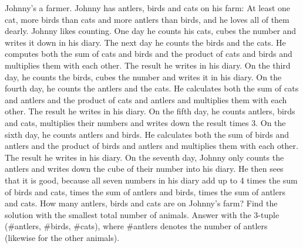 Johnny's a farmer. Johnny has antlers, birds and cats on his farm: At least one cat, more birds than cats and more antlers than birds, and he loves all of them dearly. Johnny likes counting. One day he counts his cats, cubes the number and writes it down in his diary. The next day he counts the birds and the cats. He computes both the sum of cats and birds and the product of cats and birds and multiplies them with each other. The result he writes in his diary.
On the third day, he counts the birds, cubes the number and writes it in his diary.
On the fourth day, he counts the antlers and the cats. He calculates both the sum of cats and antlers and the product of cats and antlers and multiplies them with each other. The result he writes in his diary.
On the fifth day, he counts antlers, birds and cats, multiplies their numbers and writes down the result times 3.
On the sixth day, he counts antlers and birds. He calculates both the sum of birds and antlers and the product of birds and antlers and multiplies them with each other. The result he writes in his diary.
On the seventh day, Johnny only counts the antlers and writes down the cube of their number into his diary. He then sees that it is good, because all seven numbers in his diary add up to 4 times the sum of birds and cats, times the sum of antlers and birds, times the sum of antlers and cats.
How many antlers, birds and cats are on Johnny's farm? Find the solution with the smallest total number of animals. Answer with the 3-tuple (\#antlers, \#birds, \#cats), where \#antlers denotes the number of antlers (likewise for the other animals).
